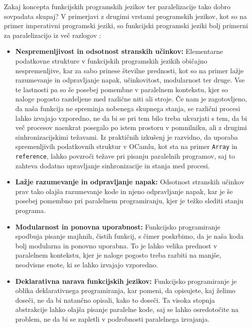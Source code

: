 \documentclass[mat1, tisk]{fmfdelo}
\begin{document}
Zakaj koncepta funkcijskih programskih jezikov ter paralelizacije tako dobro sovpadata skupaj?
V primerjavi z drugimi vrstami programskih jezikov, kot so na primer imperativni programski jeziki,
so funkcijski programski jeziki bolj primerni za paralelizacijo iz več razlogov 
\cite{parallelisation_advantages_stack_discussion_2023, functional_parallel_graph_rewriting}:

\begin{itemize} \label{itemize:prednosti_funkcijskega_programiranja}
  \item \textbf{Nespremenljivost in odsotnost stranskih učinkov:} 
    Elementarne podatkovne strukture v funkcijskih programskih jezikih običajno nespremenljive, kar za sabo prinese številne
    prednosti, kot so na primer lažje razumevanje in odpravljanje napak, učinkovitost, modularnost 
    ter druge. Vse te lastnosti pa so še posebej pomembne v paralelnem kontekstu, kjer so naloge pogosto razdeljene med
    različne niti ali stroje. Če nam je zagotovljeno, da naša funkcija ne spreminja nobenega skupnega stanja, se
    različni procesi lahko izvajajo vzporedno, ne da bi se pri tem bilo treba ukvarjati s tem, da bi več procesov
    naenkrat posegalo po istem prostoru v pomnilniku, ali z drugimi sinhronizacijskimi težavami.
    Iz praktičnih izkušenj je razvidno, da uporaba spremenljivih podatkovnih struktur v OCamlu, kot sta na primer
    \texttt{Array} in \texttt{reference}, lahko povzroči težave pri pisanju paralelnih programov, saj to zahteva
    dodatno upravljanje sinhronizacije in stanja med procesi.

  \item \textbf{Lažje razumevanje in odpravljanje napak:} 
    Odsotnost stranskih učinkov prav tako olajša razumevanje kode in njeno odpravljanje napak, kar je še posebej
    pomembno pri paralelnem programiranju, kjer je težko slediti stanju programa.

  \item \textbf{Modularnost in ponovna uporabnost:}
    Funkcijsko programiranje spodbuja pisanje majhnih, čistih funkcij, s čimer poskrbimo, da je naša koda bolj 
    modularna in ponovno uporabna. To je lahko velika prednost v paralelnem kontekstu,
    kjer je naloge pogosto treba razbiti na manjše, neodvisne enote, ki se lahko izvajajo vzporedno.

  \item \textbf{Deklarativna narava funkcijskih jezikov:} 
    Funkcijsko programiranje je oblika deklarativnega programiranja, kar pomeni, da opisujete, kaj želimo doseči, 
    ne da bi natančno opisali, kako to doseči. Ta visoka stopnja abstrakcije lahko olajša pisanje paralelne kode, 
    saj se lahko osredotočite na problem, ne da bi se zapletli v podrobnosti paralelnega izvajanja.
\end{itemize}
\end{document}
